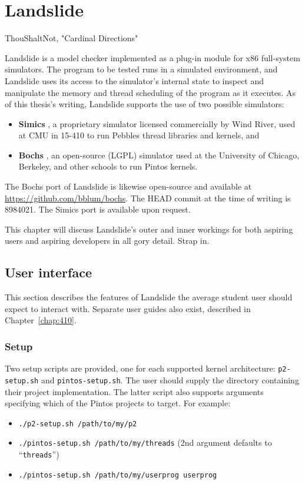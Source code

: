 \chapter{Landslide}
{ThouShaltNot, "Cardinal Directions"}

Landslide is a model checker implemented as a plug-in module for x86 full-system simulators.
The program to be tested runs in a simulated environment,
and Landslide uses its access to the simulator's internal state to inspect and manipulate the memory and thread scheduling of the program as it executes.
As of this thesis's writing, Landslide supports the use of two possible simulators:

\begin{itemize}
	\item {\bf Simics} \cite{simics}, a proprietary simulator licensed commercially by Wind River, used at CMU in 15-410 to run Pebbles thread libraries and kernels, and
	\item {\bf Bochs} \cite{bochs}, an open-source (LGPL) simulator used at the University of Chicago, Berkeley, and other schools to run Pintos kernels.
\end{itemize}

The Bochs port of Landslide is likewise open-source and available at \url{https://github.com/bblum/bochs}.
The HEAD commit at the time of writing is 8984021.
The Simics port is available upon request.

This chapter will discuss Landslide's outer and inner workings for both aspiring users and aspiring developers in all gory detail. Strap in.

\section{User interface}

This section describes the features of Landslide the average student user should expect to interact with.
Separate user guides also exist, described in Chapter~\ref{chap:410}.

\subsection{Setup}

Two setup scripts are provided, one for each supported kernel architecture: {\tt p2-setup.sh} and {\tt pintos-setup.sh}.
The user should supply the directory containing their project implementation.
The latter script also supports arguments specifying which of the Pintos projects to target.
For example:
\begin{itemize}
	\item {\tt ./p2-setup.sh /path/to/my/p2}
	\item {\tt ./pintos-setup.sh /path/to/my/threads} (2nd argument defaults to ``{\tt threads}'')
	\item {\tt ./pintos-setup.sh /path/to/my/userprog userprog}
\end{itemize}

